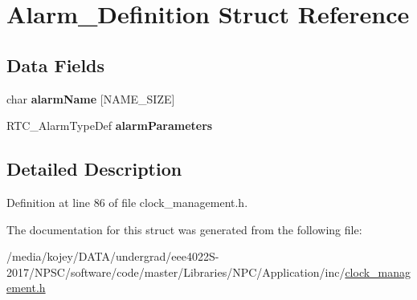 \hypertarget{struct_alarm___definition}{}\section{Alarm\+\_\+\+Definition Struct Reference}
\label{struct_alarm___definition}
\subsection*{Data Fields}
\begin{DoxyCompactItemize}
\item 
char {\bfseries alarm\+Name} \mbox{[}N\+A\+M\+E\+\_\+\+S\+I\+ZE\mbox{]}\hypertarget{struct_alarm___definition_a69a8bc4ad7884ca26f0c942d5ef3f430}{}\label{struct_alarm___definition_a69a8bc4ad7884ca26f0c942d5ef3f430}

\item 
R\+T\+C\+\_\+\+Alarm\+Type\+Def {\bfseries alarm\+Parameters}\hypertarget{struct_alarm___definition_aec96eda8f1baa300f50a7ef3d8a9f342}{}\label{struct_alarm___definition_aec96eda8f1baa300f50a7ef3d8a9f342}

\end{DoxyCompactItemize}


\subsection{Detailed Description}


Definition at line 86 of file clock\+\_\+management.\+h.



The documentation for this struct was generated from the following file\+:\begin{DoxyCompactItemize}
\item 
/media/kojey/\+D\+A\+T\+A/undergrad/eee4022\+S-\/2017/\+N\+P\+S\+C/software/code/master/\+Libraries/\+N\+P\+C/\+Application/inc/\hyperlink{clock__management_8h}{clock\+\_\+management.\+h}\end{DoxyCompactItemize}
